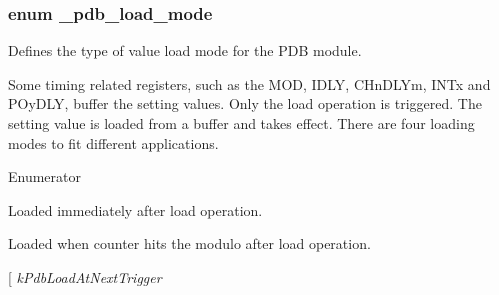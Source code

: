 \subsubsection[{\texorpdfstring{\+\_\+pdb\+\_\+load\+\_\+mode}{_pdb_load_mode}}]{\setlength{\rightskip}{0pt plus 5cm}enum {\bf \+\_\+pdb\+\_\+load\+\_\+mode}}\hypertarget{group__pdb__hal_ga24cd30e248ca866cb85a353b2c69ac65}{}\label{group__pdb__hal_ga24cd30e248ca866cb85a353b2c69ac65}


Defines the type of value load mode for the P\+DB module. 

Some timing related registers, such as the M\+OD, I\+D\+LY, C\+Hn\+D\+L\+Ym, I\+N\+Tx and P\+Oy\+D\+LY, buffer the setting values. Only the load operation is triggered. The setting value is loaded from a buffer and takes effect. There are four loading modes to fit different applications. \begin{Desc}
\item[Enumerator]\par
\begin{description}
\item[{\em 
k\+Pdb\+Load\+Immediately\hypertarget{group__pdb__hal_gga24cd30e248ca866cb85a353b2c69ac65a0426c87a5f64ded022bdc050cf1c2310}{}\label{group__pdb__hal_gga24cd30e248ca866cb85a353b2c69ac65a0426c87a5f64ded022bdc050cf1c2310}
}]Loaded immediately after load operation. \item[{\em 
k\+Pdb\+Load\+At\+Modulo\+Counter\hypertarget{group__pdb__hal_gga24cd30e248ca866cb85a353b2c69ac65aaa293dc9deca57e1aeae40e634a08365}{}\label{group__pdb__hal_gga24cd30e248ca866cb85a353b2c69ac65aaa293dc9deca57e1aeae40e634a08365}
}]Loaded when counter hits the modulo after load operation. \item[{\em 
k\+Pdb\+Load\+At\+Next\+Trigger\hypertarget{group__pdb__hal_gga24cd30e248ca866cb85a353b2c69ac65ac5681120208e96a265d73b243cca3702}{}\label{group__pdb__hal_gga24cd30e248ca866cb85a353b2c69ac65ac5681120208e96a265d73b243cca3702}
}
\end{description}
\end{Desc}
